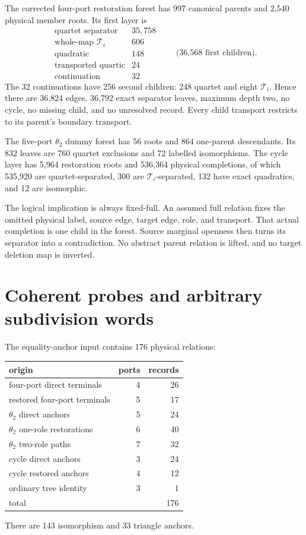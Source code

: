 \documentclass[11pt]{article}
\theoremstyle{remark}
\newcommand{\Ti}{\mathcal T_i}
\begin{document}
The corrected four-port restoration forest has 997 canonical parents and
2,540 physical member roots.  Its first layer is
\[
\begin{array}{lr}
\text{quartet separator}&35,758\\
\text{whole-map \(\Ti\)}&606\\
\text{quadratic}&148\\
\text{transported quartic}&24\\
\text{continuation}&32
\end{array}
\qquad\text{(36,568 first children).}
\]
The 32 continuations have 256 second children: 248 quartet and eight
\(\Ti\).  Hence there are 36,824 edges, 36,792 exact separator leaves,
maximum depth two, no cycle, no missing child, and no unresolved record.
Every child transport restricts to its parent's boundary transport.

The five-port \(\theta_2\) dummy forest has 56 roots and 864 one-parent
descendants.  Its 832 leaves are 760 quartet exclusions and 72 labelled
isomorphisms.  The cycle layer has 5,964 restoration roots and 536,364
physical completions, of which 535,920 are quartet-separated, 300 are
\(\Ti\)-separated, 132 have exact quadratics, and 12 are isomorphic.

The logical implication is always fixed-full.  An assumed full relation fixes
the omitted physical label, source edge, target edge, role, and transport.
That actual completion is one child in the forest.  Source marginal openness
then turns its separator into a contradiction.  No abstract parent relation
is lifted, and no target deletion map is inverted.

\section{Coherent probes and arbitrary subdivision words}\label{sec:probes}

The equality-anchor input contains 176 physical relations:
\begin{center}
\begin{tabular}{lrr}
\toprule
origin & ports & records\\
\midrule
four-port direct terminals & 4 & 26\\
restored four-port terminals & 5 & 17\\
\(\theta_2\) direct anchors & 5 & 24\\
\(\theta_2\) one-role restorations & 6 & 40\\
\(\theta_2\) two-role paths & 7 & 32\\
cycle direct anchors & 3 & 24\\
cycle restored anchors & 4 & 12\\
ordinary tree identity & 3 & 1\\
\midrule
total & & 176
\end{tabular}
\end{center}
There are 143 isomorphism and 33 triangle anchors.
\end{document}
